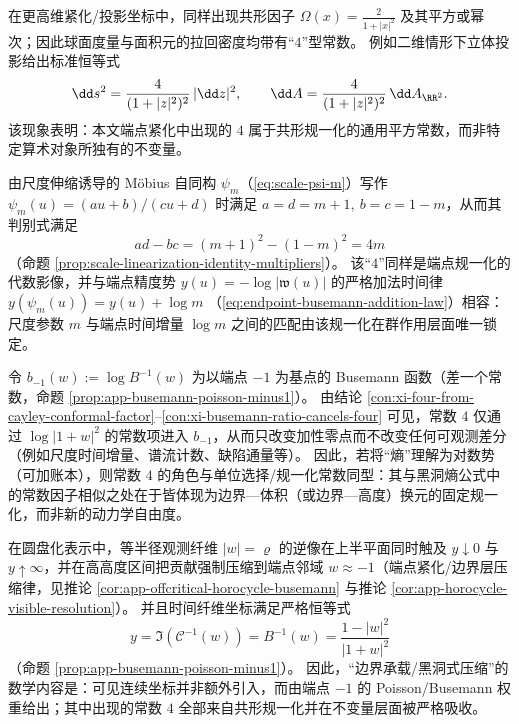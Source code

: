 \begin{proposition}\label{con:xi-four-as-universal_conformal_square}
在更高维紧化/投影坐标中，同样出现共形因子 \(\Omega(x)=\frac{2}{1+|x|^{2}}\) 及其平方或幂次；因此球面度量与面积元的拉回密度均带有“\(4\)”型常数。
例如二维情形下立体投影给出标准恒等式
\[
\dd s^{2}=\frac{4}{(1+|z|^{2})^{2}}\,|\dd z|^{2},
\qquad
\dd A=\frac{4}{(1+|z|^{2})^{2}}\,\dd A_{\RR^{2}}.
\]
该现象表明：本文端点紧化中出现的 \(4\) 属于共形规一化的通用平方常数，而非特定算术对象所独有的不变量。
\end{proposition}



\begin{proposition}\label{con:xi-four_in_mobius_discriminant}
由尺度伸缩诱导的 Möbius 自同构 \(\psi_m\)（\eqref{eq:scale-psi-m}）写作 \(\psi_m(u)=(au+b)/(cu+d)\) 时满足
\(
a=d=m+1,\ b=c=1-m
\)，从而其判别式满足
\[
ad-bc=(m+1)^{2}-(1-m)^{2}=4m
\]
（命题 \ref{prop:scale-linearization-identity-multipliers}）。
该“\(4\)”同样是端点规一化的代数影像，并与端点精度势
\(
y(u)=-\log|\mathfrak{w}(u)|
\)
的严格加法时间律
\(
y(\psi_m(u))=y(u)+\log m
\)
（\eqref{eq:endpoint-busemann-addition-law}）相容：尺度参数 \(m\) 与端点时间增量 \(\log m\) 之间的匹配由该规一化在群作用层面唯一锁定。
\end{proposition}

\begin{proposition}\label{con:xi-four-only-shifts-additive-origin}
令 \(b_{-1}(w):=\log B^{-1}(w)\) 为以端点 \(-1\) 为基点的 Busemann 函数（差一个常数，命题 \ref{prop:app-busemann-poisson-minus1}）。
由结论 \ref{con:xi-four-from-cayley-conformal-factor}--\ref{con:xi-busemann-ratio-cancels-four} 可见，常数 \(4\) 仅通过 \(\log|1+w|^{2}\) 的常数项进入 \(b_{-1}\)，从而只改变加性零点而不改变任何可观测差分（例如尺度时间增量、谱流计数、缺陷通量等）。
因此，若将“熵”理解为对数势（可加账本），则常数 \(4\) 的角色与单位选择/规一化常数同型：其与黑洞熵公式中的常数因子相似之处在于皆体现为边界—体积（或边界—高度）换元的固定规一化，而非新的动力学自由度。
\end{proposition}



\begin{proposition}\label{con:xi-timefiber-equals-poisson-weight}
在圆盘化表示中，等半径观测纤维 \(|w|=\varrho\) 的逆像在上半平面同时触及 \(y\downarrow 0\) 与 \(y\uparrow\infty\)，并在高高度区间把贡献强制压缩到端点邻域 \(w\approx -1\)（端点紧化/边界层压缩律，见推论 \ref{cor:app-offcritical-horocycle-busemann} 与推论 \ref{cor:app-horocycle-visible-resolution}）。
并且时间纤维坐标满足严格恒等式
\[
y=\Im(\mathcal{C}^{-1}(w))=B^{-1}(w)=\frac{1-|w|^{2}}{|1+w|^{2}}
\]
（命题 \ref{prop:app-busemann-poisson-minus1}）。
因此，“边界承载/黑洞式压缩”的数学内容是：可见连续坐标并非额外引入，而由端点 \(-1\) 的 Poisson/Busemann 权重给出；其中出现的常数 \(4\) 全部来自共形规一化并在不变量层面被严格吸收。
\end{proposition}

